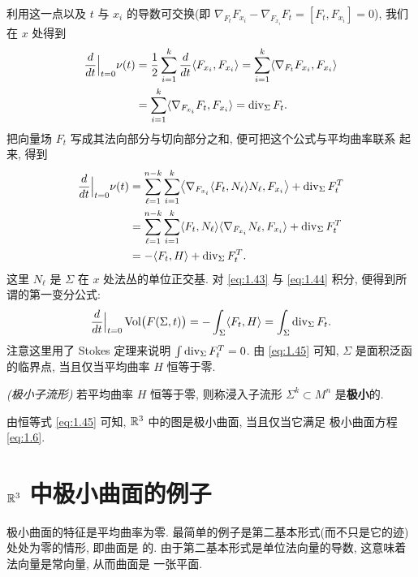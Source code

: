利用这一点以及 $t$ 与 $x_i$ 的导数可交换(即
$\nabla_{F_t}F_{x_i}-\nabla_{F_{x_i}}F_t=[F_t,F_{x_i}]=0$), 我们在 $x$ 处得到
\begin{align}
\frac{d}{dt}\Big|_{t=0}\nu(t)
 &=\frac12\sum_{i=1}^{k}\frac{d}{dt}
   \langle F_{x_i},F_{x_i}\rangle
  =\sum_{i=1}^{k}\langle\nabla_{F_t}F_{x_i},F_{x_i}\rangle \notag\\
 &=\sum_{i=1}^{k}\langle\nabla_{F_{x_i}}F_t,F_{x_i}\rangle
  =\operatorname{div}_{\Sigma}F_t.
\label{eq:1.43}
\end{align}
把向量场 $F_t$ 写成其法向部分与切向部分之和, 便可把这个公式与平均曲率联系
起来, 得到
\begin{align}
\frac{d}{dt}\Big|_{t=0}\nu(t)
 &=\sum_{\ell=1}^{n-k}\sum_{i=1}^{k}
   \bigl\langle\nabla_{F_{x_i}}\langle F_t,N_\ell\rangle N_\ell,F_{x_i}\bigr\rangle
   +\operatorname{div}_{\Sigma}F_t^T \notag\\
 &=\sum_{\ell=1}^{n-k}\sum_{i=1}^{k}
   \langle F_t,N_\ell\rangle\langle\nabla_{F_{x_i}}N_\ell,F_{x_i}\rangle
   +\operatorname{div}_{\Sigma}F_t^T \notag\\
 &=-\langle F_t,H\rangle+\operatorname{div}_{\Sigma}F_t^T.
\label{eq:1.44}
\end{align}
这里 $N_\ell$ 是 $\Sigma$ 在 $x$ 处法丛的单位正交基. 对 \eqref{eq:1.43} 与
\eqref{eq:1.44} 积分, 便得到所谓的第一变分公式:
\begin{equation}
\frac{d}{dt}\Big|_{t=0}\operatorname{Vol}\bigl(F(\Sigma,t)\bigr)
 =-\int_{\Sigma}\langle F_t,H\rangle
 =\int_{\Sigma}\operatorname{div}_{\Sigma}F_t.
\label{eq:1.45}
\end{equation}
注意这里用了 Stokes 定理来说明 $\int\operatorname{div}_{\Sigma}F_t^T=0$. 由
\eqref{eq:1.45} 可知, $\Sigma$ 是面积泛函的临界点, 当且仅当平均曲率 $H$
恒等于零.

\begin{definition}
\label{def:1.4}
\emph{(极小子流形)} 若平均曲率 $H$ 恒等于零, 则称浸入子流形
$\Sigma^k\subset M^n$ 是\textbf{极小}的.
\end{definition}

由恒等式 \eqref{eq:1.45} 可知, $\mathbb{R}^3$ 中的图是极小曲面, 当且仅当它满足
极小曲面方程 \eqref{eq:1.6}.

\section{$\mathbb{R}^3$ 中极小曲面的例子}
\label{sec:1.2}

极小曲面的特征是平均曲率为零. 最简单的例子是第二基本形式(而不只是它的迹)
处处为零的情形, 即曲面是
的. 由于第二基本形式是单位法向量的导数, 这意味着法向量是常向量, 从而曲面是
一张平面.

